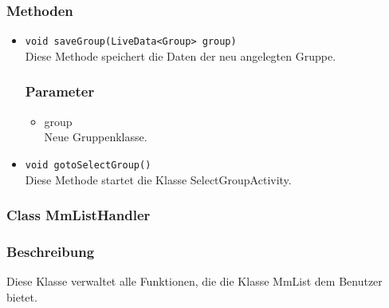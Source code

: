 \documentclass[a4paper]{scrreprt}
\begin{document}
\subsubsection*{Methoden}
\begin{addmargin}[25pt]{0pt}
\begin{itemize}

\item \texttt{void saveGroup(LiveData<Group> group)}\\
	Diese Methode speichert die Daten der neu angelegten Gruppe.

	\subsubsection*{Parameter}
	\begin{itemize}
	\item group \\
		Neue Gruppenklasse.
	\end{itemize}

\item \texttt{void gotoSelectGroup()}\\
Diese Methode startet die Klasse SelectGroupActivity.

\end{itemize}
\end{addmargin}


\subsubsection{Class MmListHandler}
\subsubsection*{Beschreibung}
Diese Klasse verwaltet alle Funktionen, die die Klasse MmList dem Benutzer bietet.
\end{document}
